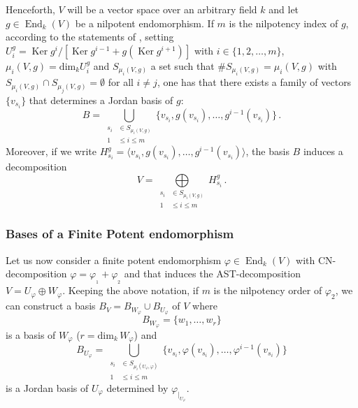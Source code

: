 \documentclass[10pt,a4paper]{amsart}
\theoremstyle{plain}
\theoremstyle{remark}
\numberwithin{equation}{section} \numberwithin{defn}{section}
\newcommand\ed{\operatorname{End}}
\newcommand\Ker{\operatorname{Ker}}
\begin{document}
Henceforth, $V$ will be a vector space over an arbitrary field $k$ and let $g\in\ed_k (V)$ be a nilpotent endomorphism. If $m$ is the nilpotency index of $g$, according to the statements of \cite{Pa},  setting $U_i^g = \Ker g^i/[\Ker g^{i-1} + g(\Ker g^{i+1})]$ with $i\in \{1,2,\dots, m\}$, $\mu_i (V,g) = \text{dim}_k U_i^g$ and $S_{\mu_i (V,g)}$ a set such that $\# S_{\mu_i (V,g)} = \mu_i (V,g)$ with $S_{\mu_i (V,g)} \cap S_{\mu_j (V,g)} = \emptyset$ for all $i \ne j$, one has that there exists a family of vectors $\{{ {v_{s_i}}}\}$  that determines a Jordan basis of $g$: \begin{equation} \label{eq:jordan-basis-B} B = \underset {\begin{aligned} s_i &\in S_{{\mu}_i (V,g)} \\ 1 &\leq i \leq m \end{aligned}} {\bigcup} \{{ {v_{s_i}}}, g ({{ v_{s_i}}}), \dots , g^{i-1} ({ {v_{s_i}}})\}\, .\end{equation}
Moreover, if we write $H_{s_i}^g = \langle { {v_{s_i}}}, g ({{ v_{s_i}}}), \dots , g^{i-1} ({ {v_{s_i}}}) \rangle$, the basis $B$ induces a decomposition \begin{equation} \label{eq:decomp} V =  \underset {\begin{aligned} s_i &\in S_{{\mu}_i (V,g)} \\ 1 &\leq i \leq m \end{aligned}} \bigoplus H_{s_i}^g\, .\end{equation}

\subsubsection{Bases of a Finite Potent endomorphism} \label{ss:basis-fp.endormo}

Let us now consider a finite potent endomorphism $\varphi \in \ed_k (V)$ with CN-decomposition $\varphi = \varphi_{_1} + \varphi_{_2}$ and that induces the AST-decomposition $V = U_\varphi \oplus W_\varphi$. Keeping the above notation, if $m$ is the nilpotency order of $\varphi_2$, we can construct a basis $B_V = B_{W_\varphi} \cup B_{U_\varphi}$ of $V$ where $$ B_{W_\varphi} = \{w_1, \dots, w_r\}$$\noindent is a basis of $W_\varphi$ ($r = \text{dim}_k \, W_\varphi$) and $$ B_{U_\varphi} =  \underset {\begin{aligned} s_i &\in S_{{\mu}_i (U_\varphi, \varphi)} \\ 1 &\leq i \leq m \end{aligned}} {\bigcup} \{{ {v_{s_i}}}, \varphi ({{ v_{s_i}}}), \dots , \varphi^{i-1} ({ {v_{s_i}}})\}$$\noindent is a Jordan basis of $U_\varphi$ determined by $\varphi_{\vert_{U_\varphi}}$.
\end{document}
